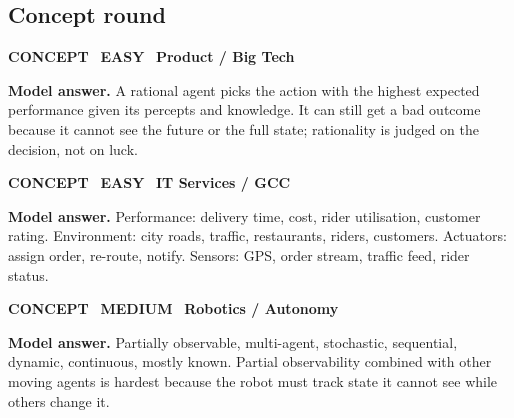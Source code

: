 \documentclass[11pt]{article}
\begin{document}
\subsection*{\color{teal}Concept round}
\begin{tcolorbox}[enhanced,breakable,colback=white,colframe=teal,arc=2mm,boxrule=0.8pt,left=3mm,right=3mm,
 title={\textbf{QI.01}\quad What is a rational agent, and why is rational not the same as perfect?},fonttitle=\color{white}\small,colbacktitle=teal]
\colorbox{teal!15}{\scriptsize\bfseries\color{teal} CONCEPT}\
\colorbox{leaf!15}{\scriptsize\bfseries\color{leaf} EASY}\
\colorbox{navy!8}{\scriptsize\bfseries\color{navy} Product / Big Tech}\par\smallskip
\textbf{\color{navy}Model answer.} A rational agent picks the action with the highest expected performance given its percepts and knowledge. It can still get a bad outcome because it cannot see the future or the full state; rationality is judged on the decision, not on luck.
\end{tcolorbox}
\begin{tcolorbox}[enhanced,breakable,colback=white,colframe=teal,arc=2mm,boxrule=0.8pt,left=3mm,right=3mm,
 title={\textbf{QI.02}\quad Write the PEAS description for a food-delivery app's rider-assignment agent.},fonttitle=\color{white}\small,colbacktitle=teal]
\colorbox{teal!15}{\scriptsize\bfseries\color{teal} CONCEPT}\
\colorbox{leaf!15}{\scriptsize\bfseries\color{leaf} EASY}\
\colorbox{navy!8}{\scriptsize\bfseries\color{navy} IT Services / GCC}\par\smallskip
\textbf{\color{navy}Model answer.} Performance: delivery time, cost, rider utilisation, customer rating. Environment: city roads, traffic, restaurants, riders, customers. Actuators: assign order, re-route, notify. Sensors: GPS, order stream, traffic feed, rider status.
\end{tcolorbox}
\begin{tcolorbox}[enhanced,breakable,colback=white,colframe=teal,arc=2mm,boxrule=0.8pt,left=3mm,right=3mm,
 title={\textbf{QI.03}\quad Classify a warehouse robot's environment along the seven properties and say which property makes it hardest.},fonttitle=\color{white}\small,colbacktitle=teal]
\colorbox{teal!15}{\scriptsize\bfseries\color{teal} CONCEPT}\
\colorbox{gold!85!black!15}{\scriptsize\bfseries\color{gold!85!black} MEDIUM}\
\colorbox{navy!8}{\scriptsize\bfseries\color{navy} Robotics / Autonomy}\par\smallskip
\textbf{\color{navy}Model answer.} Partially observable, multi-agent, stochastic, sequential, dynamic, continuous, mostly known. Partial observability combined with other moving agents is hardest because the robot must track state it cannot see while others change it.
\end{tcolorbox}
\end{document}
